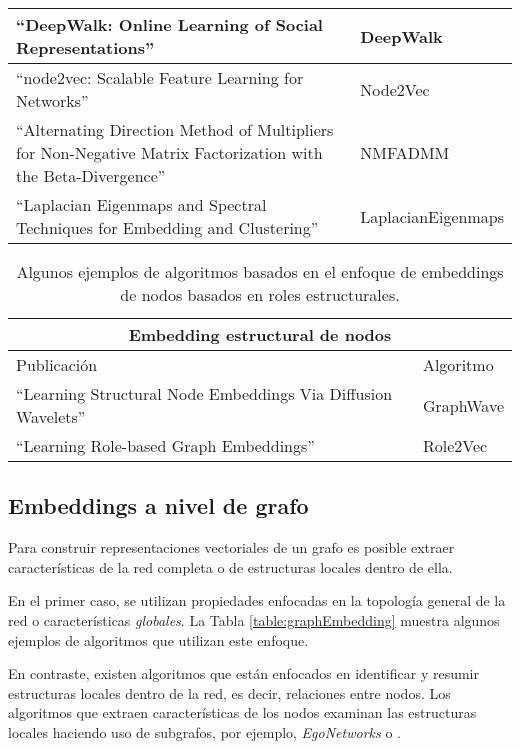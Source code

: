 \begin{longtable}
\begin{tabular}{ |p{}|p{}|  }
    \hline
    “DeepWalk: Online Learning of Social Representations” \cite{perozzi_deepwalk_2014} & DeepWalk \\
    \hline
    “node2vec: Scalable Feature Learning for Networks” \cite{grover_node2vec_2016} & Node2Vec \\
    \hline
    “Alternating Direction Method of Multipliers for Non-Negative Matrix Factorization with the Beta-Divergence” \cite{sun_alternating_2014} & NMFADMM \\
    \hline
    “Laplacian Eigenmaps and Spectral Techniques for Embedding and Clustering” \cite{dietterich_laplacian_2002} & LaplacianEigenmaps \\
    \hline
    \end{tabular}
\end{longtable}



\begin{table}
    \centering
\caption{Algunos ejemplos de algoritmos basados en el enfoque de embeddings de nodos basados en roles estructurales.}
\label{table:structuralNodeEmbedding}
    \begin{tabular}{ |p{8cm}|p{2cm}|  }
    \hline
    \multicolumn{2}{|c|}{Embedding estructural de nodos} \\
    \hline
    Publicación & Algoritmo  \\
    \hline
    “Learning Structural Node Embeddings Via Diffusion Wavelets” \cite{donnat_learning_2018} & GraphWave  \\
    \hline
    “Learning Role-based Graph Embeddings” \cite{ahmed_role-based_2022} & Role2Vec \\
    \hline
    \end{tabular}
\end{table}


\subsection{Embeddings a nivel de grafo}

Para construir representaciones vectoriales de un grafo es posible extraer características de la red completa o de estructuras locales dentro de ella.

En el primer caso, se utilizan propiedades enfocadas en la topología general de la red o características \emph{globales}. La Tabla \ref{table:graphEmbedding} muestra algunos ejemplos de algoritmos que utilizan este enfoque. 

En contraste, existen algoritmos que están enfocados en identificar y resumir estructuras locales dentro de la red, es decir, relaciones entre nodos. Los algoritmos que extraen características de los nodos examinan las estructuras locales haciendo uso de subgrafos, por ejemplo, \textit{EgoNetworks} o \graphlets. 

